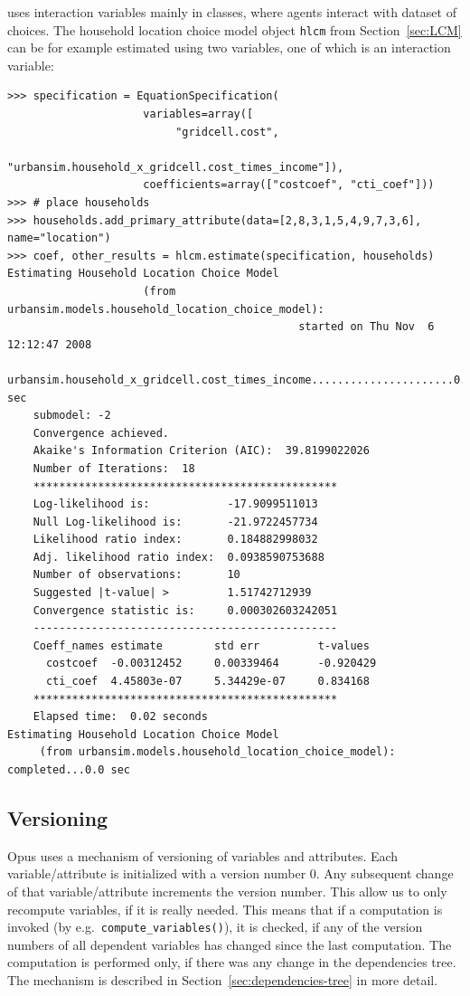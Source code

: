  uses interaction variables \variablesindex mainly in  classes, where agents
interact with dataset \datasetindex of choices. The household location choice model object
\verb|hlcm| from Section~\ref{sec:LCM} can be for example estimated using two
variables, \variablesindex one of which is an interaction variable: \variablesindex
\primaryattributesindex
\begin{verbatim}
>>> specification = EquationSpecification(
                     variables=array([
                          "gridcell.cost",
                          "urbansim.household_x_gridcell.cost_times_income"]),
                     coefficients=array(["costcoef", "cti_coef"]))
>>> # place households
>>> households.add_primary_attribute(data=[2,8,3,1,5,4,9,7,3,6], name="location")
>>> coef, other_results = hlcm.estimate(specification, households)
Estimating Household Location Choice Model 
                     (from urbansim.models.household_location_choice_model): 
                                             started on Thu Nov  6 12:12:47 2008
    urbansim.household_x_gridcell.cost_times_income......................0.0 sec
    submodel: -2
    Convergence achieved.
    Akaike's Information Criterion (AIC):  39.8199022026
    Number of Iterations:  18
    ***********************************************
    Log-likelihood is:            -17.9099511013
    Null Log-likelihood is:       -21.9722457734
    Likelihood ratio index:       0.184882998032
    Adj. likelihood ratio index:  0.0938590753688
    Number of observations:       10
    Suggested |t-value| >         1.51742712939
    Convergence statistic is:     0.000302603242051
    -----------------------------------------------
    Coeff_names estimate        std err         t-values
      costcoef  -0.00312452     0.00339464      -0.920429
      cti_coef  4.45803e-07     5.34429e-07     0.834168
    ***********************************************
    Elapsed time:  0.02 seconds
Estimating Household Location Choice Model 
     (from urbansim.models.household_location_choice_model): completed...0.0 sec
\end{verbatim}
\coefficientsindex
\label{page:iv-spec}

%
\subsection{Versioning}
\label{sec:versioning}
%
Opus uses a mechanism of versioning of variables \variablesindex and attributes. \attributesindex Each
variable/attribute \variablesindex\attributesindex is initialized with a version number 0. Any subsequent
change of that variable/attribute \variablesindex\attributesindex increments the version number. This allow us
to only recompute variables, \variablesindex if it is really needed. This means that if a
computation is invoked (by e.g.\ \verb|compute_variables()|), \variablesindex it is checked, if
any of the version numbers of all dependent variables \variablesindex has changed since the
last computation. The computation is performed only, if there was any change
in the dependencies tree. The mechanism is described in Section~\ref{sec:dependencies-tree}
in more detail.

